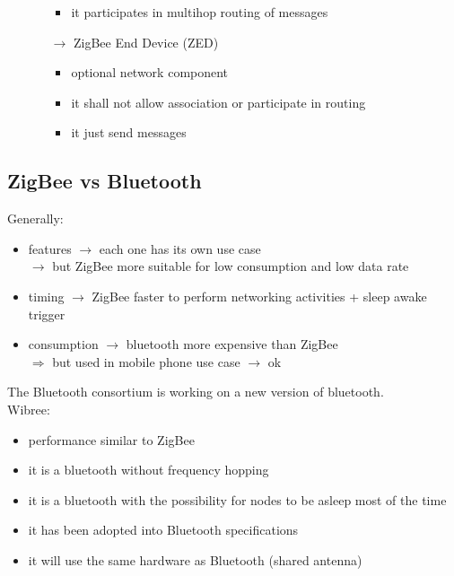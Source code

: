 \begin{itemize}
\begin{itemize}
\begin{itemize}
            \item it participates in multihop routing of messages
        \end{itemize}
        \item[$\rightarrow$] ZigBee End Device (ZED)
        \begin{itemize}
            \item optional network component
            \item it shall not allow association or participate in routing
            \item it just send messages
        \end{itemize}  
    \end{itemize}
\end{itemize}

\subsection{ZigBee vs Bluetooth}
Generally:
\begin{itemize}
    \item features $\rightarrow$ each one has its own use case\\
    $\rightarrow$ but ZigBee more suitable for low consumption and low data rate
    \item timing $\rightarrow$ ZigBee faster to perform networking activities + sleep awake trigger
    \item consumption $\rightarrow$ bluetooth more expensive than ZigBee\\
    $\Rightarrow$ but used in mobile phone use case $\rightarrow$ ok
\end{itemize}
\vspace*{0.5cm}
The Bluetooth consortium is working on a new version of bluetooth.\\[0.3cm]
Wibree:
\begin{itemize}
    \item performance similar to ZigBee
    \item it is a bluetooth without frequency hopping 
    \item it is a bluetooth with the possibility for nodes
    to be asleep most of the time
    \item it has been adopted into Bluetooth specifications
    \item it will use the same hardware as Bluetooth (shared antenna)
\end{itemize}